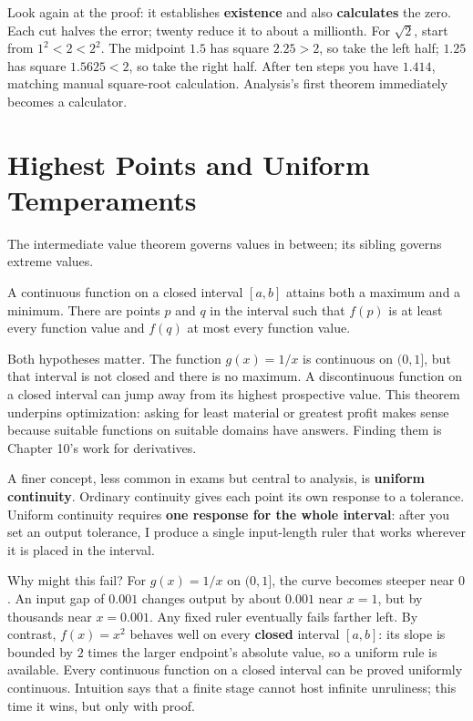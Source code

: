 Look again at the proof: it establishes \textbf{existence} and also \textbf{calculates} the zero. Each cut halves the error; twenty reduce it to about a millionth. For $\sqrt{2}$, start from $1^2<2<2^2$. The midpoint $1.5$ has square $2.25>2$, so take the left half; $1.25$ has square $1.5625<2$, so take the right half. After ten steps you have $1.414$, matching manual square-root calculation. Analysis's first theorem immediately becomes a calculator.

\section{Highest Points and Uniform Temperaments}

The intermediate value theorem governs values in between; its sibling governs extreme values.

\begin{dingli}
A continuous function on a closed interval $[a,b]$ attains both a maximum and a minimum. There are points $p$ and $q$ in the interval such that $f(p)$ is at least every function value and $f(q)$ at most every function value.
\end{dingli}

Both hypotheses matter. The function $g(x)=1/x$ is continuous on $(0,1]$, but that interval is not closed and there is no maximum. A discontinuous function on a closed interval can jump away from its highest prospective value. This theorem underpins optimization: asking for least material or greatest profit makes sense because suitable functions on suitable domains have answers. Finding them is Chapter 10's work for derivatives.

A finer concept, less common in exams but central to analysis, is \textbf{uniform continuity}. Ordinary continuity gives each point its own response to a tolerance. Uniform continuity requires \textbf{one response for the whole interval}: after you set an output tolerance, I produce a single input-length ruler that works wherever it is placed in the interval.

Why might this fail? For $g(x)=1/x$ on $(0,1]$, the curve becomes steeper near $0$. An input gap of $0.001$ changes output by about $0.001$ near $x=1$, but by thousands near $x=0.001$. Any fixed ruler eventually fails farther left. By contrast, $f(x)=x^2$ behaves well on every \textbf{closed} interval $[a,b]$: its slope is bounded by $2$ times the larger endpoint's absolute value, so a uniform rule is available. Every continuous function on a closed interval can be proved uniformly continuous. Intuition says that a finite stage cannot host infinite unruliness; this time it wins, but only with proof.


